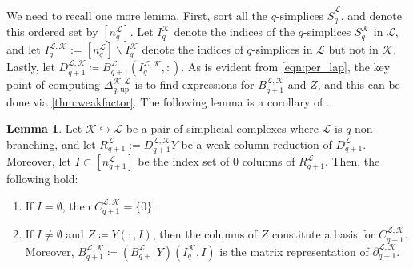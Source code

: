 \documentclass{article}
\theoremstyle{definition}
\newtheorem{lemma}[theorem]{Lemma}
\newcommand{\KK}{\mathcal{K}}
\newcommand{\LL}{\mathcal{L}}
\begin{document}
We need to recall one more lemma. First, sort all the $q$-simplices $\bar{S}_q^\LL$,
and denote this ordered set by $[n_q^\LL]$. Let $I_q^\KK$ denote the indices of the $q$-simplices $S_q^\KK$ in $\LL$, and let $I_q^{\LL, \KK}:=[n_{q}^\LL]\backslash I_q^\KK$ denote the indices of $q$-simplices in $\LL$ but not in $\KK$. Lastly, let $D_{q+1}^{\LL, \KK}\coloneqq B_{q+1}^\LL(I_q^{\LL, \KK}, :)$.
As is evident from \eqref{eqn:per_lap}, the key point of computing $\Delta_{q, \mathrm{up}}^{\KK, \LL}$ is to find expressions for $B_{q+1}^{\LL, \KK}$ and $Z$, and this can be done via \cref{thm:weakfactor}.
The following lemma is a corollary of \cite[Lemma 3.4]{pers_lap}.

\begin{lemma}\label{lemma:pers_lap_memoli}
Let $\KK\hookrightarrow \LL$ be a pair of  simplicial complexes where $\LL$ is $q$-non-branching, and let $R_{q+1}^{\LL}:= D_{q+1}^{\LL, \KK} Y$ be a weak column reduction of $D_{q+1}^{\LL}$.
Moreover, let $I\subset [n_{q+1}^\LL]$ be the index set of $0$ columns of $R_{q+1}^\LL$.
Then, the following hold:
\begin{enumerate}
    \item If $I=\emptyset$,
    then $C_{q+1}^{\LL, \KK}=\{0\}$.
    \item If $I\neq \emptyset$ and $Z\coloneqq Y(:, I)$,
    then the columns of $Z$ constitute a basis for $C_{q+1}^{\LL, \KK}$.
    Moreover,
    $B_{q+1}^{\LL, \KK}\coloneqq (B_{q+1}^\LL Y)(I_q^{\KK}, I)$ is the matrix representation of $\partial_{q+1}^{\LL, \KK}$.
\end{enumerate}
\end{lemma}
\end{document}
